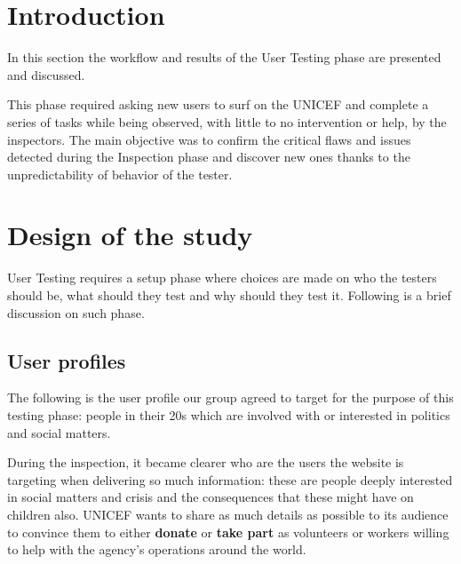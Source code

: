 \section{Introduction}
In this section the workflow and results of the User Testing phase are presented and discussed.

This phase required asking new users to surf on the UNICEF and complete a series of tasks while being observed, with little to no intervention or help, by the inspectors. The main objective was to confirm the critical flaws and issues detected during the Inspection phase and discover new ones thanks to the unpredictability of behavior of the tester.

\section{Design of the study}
User Testing requires a setup phase where choices are made on who the testers should be, what should they test and why should they test it. Following is a brief discussion on such phase.

\subsection{User profiles}
The following is the user profile our group agreed to target for the purpose of this testing phase: people in their 20s which are involved with or interested in politics and social matters.

During the inspection, it became clearer who are the users the website is targeting when delivering so much information: these are people deeply interested in social matters and crisis and the consequences that these might have on children also. UNICEF wants to share as much details as possible to its audience to convince them to either \textbf{donate} or \textbf{take part} as volunteers or workers willing to help with the agency's operations around the world.


